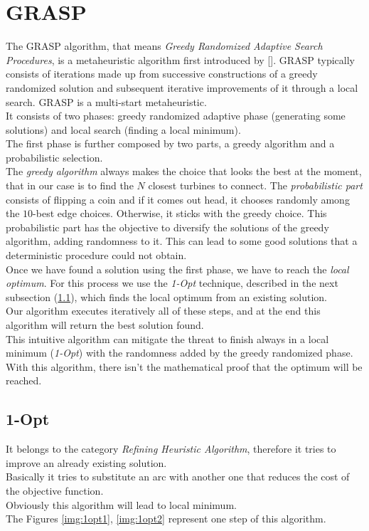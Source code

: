 \section{GRASP}
The GRASP algorithm, that means \textit{Greedy Randomized Adaptive Search Procedures}, is a metaheuristic algorithm first introduced by [\cite{feo1995greedy}]. GRASP typically consists of iterations made up from successive constructions of a greedy randomized solution and subsequent iterative improvements of it through a local search. GRASP is a multi-start metaheuristic. \\
It consists of two phases: greedy randomized adaptive phase (generating some solutions) and local search (finding a local minimum).\\
The first phase is further composed by two parts, a greedy algorithm and a probabilistic selection.\\
The \textit{greedy algorithm} always makes the choice that looks the best at the moment, that in our case is to find the $N$ closest turbines to connect. The \textit{probabilistic part} consists of flipping a coin and if it comes out head, it chooses randomly among the $10$-best edge choices. Otherwise, it sticks with the greedy choice. This probabilistic part has the objective to diversify the solutions of the greedy algorithm, adding randomness to it. This can lead to some good solutions that a deterministic procedure could not obtain.\\
Once we have found a solution using the first phase, we have to reach the \textit{local optimum}. For this process we use the \textit{1-Opt} technique, described in the next subsection (\ref{subsec:1opt}), which finds the local optimum from an existing solution.\\
Our algorithm executes iteratively all of these steps, and at the end this algorithm will return the best solution found. \\
This intuitive algorithm can mitigate the threat to finish always in a local minimum (\textit{1-Opt}) with the randomness added by the greedy randomized phase.\\ 
With this algorithm, there isn't the mathematical proof that the optimum will be reached. 
\subsection{1-Opt} \label{subsec:1opt}
It belongs to the category \textit{Refining Heuristic Algorithm}, therefore it tries to improve an already existing solution.\\                                                         
Basically it tries to substitute an arc with another one that reduces the cost of the objective function. \\
Obviously this algorithm will lead to local minimum. \\
The Figures \ref{img:1opt1}, \ref{img:1opt2} represent one step of this algorithm. \\

